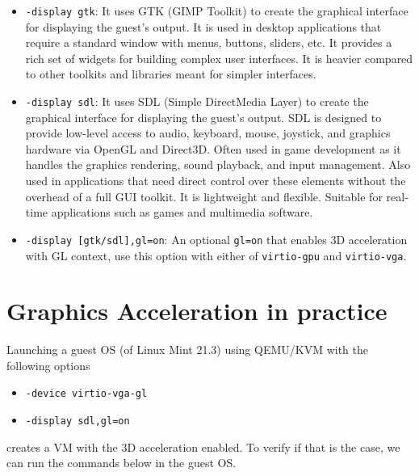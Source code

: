 \documentclass[a4paper,12pt, final]{report}
\begin{document}
\begin{itemize}
    \item \verb|-display gtk|: It uses GTK (GIMP Toolkit) to create the graphical interface for displaying the guest's output. It is used in desktop applications that require a standard window with menus, buttons, sliders, etc. It provides a rich set of widgets for building complex user interfaces. It is heavier compared to other toolkits and libraries meant for simpler interfaces.
    \item \verb|-display sdl|: It uses SDL (Simple DirectMedia Layer) to create the graphical interface for displaying the guest's output. SDL is designed to provide low-level access to audio, keyboard, mouse, joystick, and graphics hardware via OpenGL and Direct3D. Often used in game development as it handles the graphics rendering, sound playback, and input management. Also used in applications that need direct control over these elements without the overhead of a full GUI toolkit. It is lightweight and flexible. Suitable for real-time applications such as games and multimedia software.
    \item \verb|-display [gtk/sdl],gl=on|: An optional \verb|gl=on| that enables 3D acceleration with GL context, use this option with either of \verb|virtio-gpu| and \verb|virtio-vga|.
\end{itemize}

\section{Graphics Acceleration in practice}
\noindent Launching a guest OS (of Linux Mint 21.3) using QEMU/KVM with the following options
\begin{itemize}
    \item \verb|-device virtio-vga-gl|
    \item \verb|-display sdl,gl=on|
\end{itemize}

\noindent creates a VM with the 3D acceleration enabled. To verify if that is the case, we can run the commands below in the guest OS.
\end{document}
